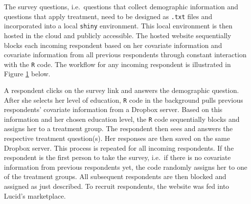 \documentclass[12pt,econ]{sources/authesis}
\makeatletter
\def\caption{\refstepcounter\@captype \@dblarg{\@caption\@captype}}
\makeatother
\begin{document}
The survey questions, i.e.~questions that collect demographic information and questions that apply treatment, need to be designed as \texttt{.txt} files and incorporated into a local \texttt{shiny} environment. This local environment is then hosted in the cloud and publicly accessible. The hosted website sequentially blocks each incoming respondent based on her covariate information and covariate information from all previous respondents through constant interaction with the \texttt{R} code. The workflow for any incoming respondent is illustrated in Figure \ref{online-workflow} below.

\vspace{0.8cm}
\begin{figure}[ht]
\centering
{}
\caption{Online Survey Experiment Workflow} \label{online-workflow}
\end{figure}
A respondent clicks on the survey link and answers the demographic question. After she selects her level of education, \texttt{R} code in the background pulls previous respondents' covariate information from a Dropbox server. Based on this information and her chosen education level, the \texttt{R} code sequentially blocks and assigns her to a treatment group. The respondent then sees and answers the respective treatment question(s). Her responses are then saved on the same Dropbox server. This process is repeated for all incoming respondents. If the respondent is the first person to take the survey, i.e.~if there is no covariate information from previous respondents yet, the code randomly assigns her to one of the treatment groups. All subsequent respondents are then blocked and assigned as just described. To recruit respondents, the website was fed into Lucid's marketplace.
\end{document}
